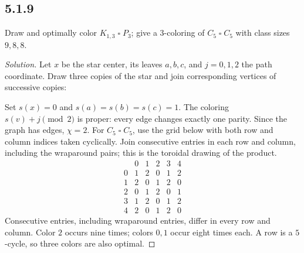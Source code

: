 \documentclass[12pt]{amsart}
\newenvironment{solution}{\begin{proof}[Solution]}{\end{proof}}
\newcommand{\cart}{\mathbin{\square}}
\begin{document}
    \subsection*{5.1.9} Draw and optimally color $K_{1,3}\cart P_3$; give a $3$-coloring of $C_5\cart C_5$ with class sizes $9,8,8$.
    \begin{solution}Let $x$ be the star center, its leaves $a,b,c$, and $j=0,1,2$ the path coordinate. Draw three copies of the star and join corresponding vertices of successive copies:
        \begin{center}\end{center}
        Set $s(x)=0$ and $s(a)=s(b)=s(c)=1$. The coloring $s(v)+j\pmod2$ is proper: every edge changes exactly one parity. Since the graph has edges, $\chi=2$.
        For $C_5\cart C_5$, use the grid below with both row and column indices taken cyclically. Join consecutive entries in each row and column, including the wraparound pairs; this is the toroidal drawing of the product.
        \[
            \begin{array}{c|ccccc}
                &0&1&2&3&4\\\hline
                0&1&2&0&1&2\\
                1&2&0&1&2&0\\
                2&0&1&2&0&1\\
                3&1&2&0&1&2\\
                4&2&0&1&2&0
            \end{array}
        \]
        Consecutive entries, including wraparound entries, differ in every row and column. Color $2$ occurs nine times; colors $0,1$ occur eight times each. A row is a $5$-cycle, so three colors are also optimal.\end{solution}
\end{document}
